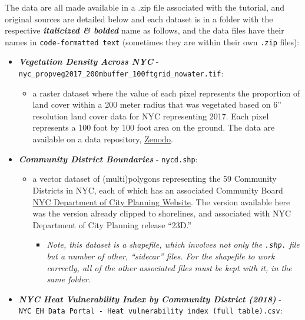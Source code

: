 \documentclass[
  letterpaper,
  DIV=11,
  numbers=noendperiod]{scrreprt}
\providecommand{\tightlist}{%
  \setlength{\itemsep}{0pt}\setlength{\parskip}{0pt}}\usepackage{longtable,booktabs,array}
\begin{document}
The data are all made available in a .zip file associated with the
tutorial, and original sources are detailed below and each dataset is in
a folder with the respective \textbf{\emph{italicized \& bolded}} name
as follows, and the data files have their names in
\texttt{code-formatted\ text} (sometimes they are within their own
\texttt{.zip} files):

\begin{itemize}
\tightlist
\item
  \textbf{\emph{Vegetation Density Across NYC}} -
  \texttt{nyc\_propveg2017\_200mbuffer\_100ftgrid\_nowater.tif}:

  \begin{itemize}
  \tightlist
  \item
    a raster dataset where the value of each pixel represents the
    proportion of land cover within a 200 meter radius that was
    vegetated based on 6'' resolution land cover data for NYC
    representing 2017. Each pixel represents a 100 foot by 100 foot area
    on the ground. The data are available on a data repository,
    \href{https://zenodo.org/records/8370381}{Zenodo}.
  \end{itemize}
\item
  \textbf{\emph{Community District Boundaries}} - \texttt{nycd.shp}:

  \begin{itemize}
  \tightlist
  \item
    a vector dataset of (multi)polygons representing the 59 Community
    Districts in NYC, each of which has an associated Community Board
    \href{https://www.nyc.gov/site/planning/data-maps/open-data/districts-download-metadata.page}{NYC
    Department of City Planning Website}. The version available here was
    the version already clipped to shorelines, and associated with NYC
    Department of City Planning release ``23D.''

    \begin{itemize}
    \tightlist
    \item
      \emph{Note, this dataset is a shapefile, which involves not only
      the \texttt{.shp.} file but a number of other, ``sidecar'' files.
      For the shapefile to work correctly, all of the other associated
      files must be kept with it, in the same folder.}
    \end{itemize}
  \end{itemize}
\item
  \textbf{\emph{NYC Heat Vulnerability Index by Community District
  (2018)}} -
  \texttt{NYC\ EH\ Data\ Portal\ -\ Heat\ vulnerability\ index\ (full\ table).csv}:


\end{itemize}
\end{document}
